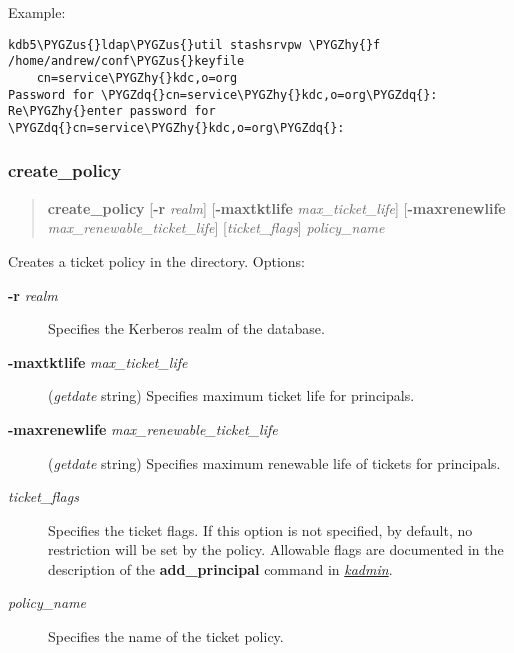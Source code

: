 \documentclass[letterpaper,10pt,english]{sphinxmanual}
\def\PYGZus{\char`\_}
\def\PYGZhy{\char`\-}
\def\PYGZdq{\char`\"}
\begin{document}
Example:

\begin{Verbatim}[commandchars=\\\{\}]
kdb5\PYGZus{}ldap\PYGZus{}util stashsrvpw \PYGZhy{}f /home/andrew/conf\PYGZus{}keyfile
    cn=service\PYGZhy{}kdc,o=org
Password for \PYGZdq{}cn=service\PYGZhy{}kdc,o=org\PYGZdq{}:
Re\PYGZhy{}enter password for \PYGZdq{}cn=service\PYGZhy{}kdc,o=org\PYGZdq{}:
\end{Verbatim}


\subsubsection{create\_policy}
\label{admin/admin_commands/kdb5_ldap_util:create-policy}\label{admin/admin_commands/kdb5_ldap_util:kdb5-ldap-util-stashsrvpw-end}\label{admin/admin_commands/kdb5_ldap_util:kdb5-ldap-util-create-policy}\begin{quote}

\textbf{create\_policy}
{[}\textbf{-r} \emph{realm}{]}
{[}\textbf{-maxtktlife} \emph{max\_ticket\_life}{]}
{[}\textbf{-maxrenewlife} \emph{max\_renewable\_ticket\_life}{]}
{[}\emph{ticket\_flags}{]}
\emph{policy\_name}
\end{quote}

Creates a ticket policy in the directory.  Options:
\begin{description}
\item[{\textbf{-r} \emph{realm}}] \leavevmode
Specifies the Kerberos realm of the database.

\item[{\textbf{-maxtktlife} \emph{max\_ticket\_life}}] \leavevmode
(\emph{getdate} string) Specifies maximum ticket life for
principals.

\item[{\textbf{-maxrenewlife} \emph{max\_renewable\_ticket\_life}}] \leavevmode
(\emph{getdate} string) Specifies maximum renewable life of
tickets for principals.

\item[{\emph{ticket\_flags}}] \leavevmode
Specifies the ticket flags.  If this option is not specified, by
default, no restriction will be set by the policy.  Allowable
flags are documented in the description of the \textbf{add\_principal}
command in {\hyperref[admin/admin_commands/kadmin_local:kadmin-1]{\emph{kadmin}}}.

\item[{\emph{policy\_name}}] \leavevmode
Specifies the name of the ticket policy.

\end{description}
\end{document}
